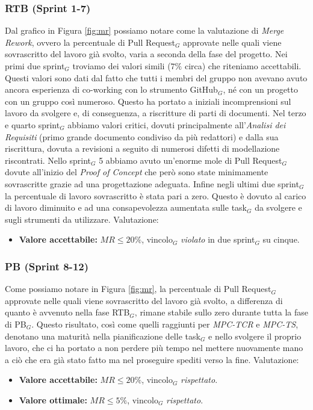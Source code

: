 \documentclass[a4paper, 10pt, colorlinks=true, linkcolor=black, urlcolor=blue, citecolor=blue, hidelinks]{article}
\begin{document}
\subsubsection{RTB (Sprint 1-7)}
Dal grafico in Figura \ref{fig:mr} possiamo notare come la valutazione di \textit{Merge Rework}, ovvero la percentuale di Pull Request$_G$ approvate nelle quali viene sovrascritto del lavoro già svolto, varia a seconda della fase del progetto. Nei primi due sprint$_G$ troviamo dei valori simili ($7\%$ circa) che riteniamo accettabili. Questi valori sono dati dal fatto che tutti i membri del gruppo non avevano avuto ancora esperienza di co-working con lo strumento GitHub$_G$, né con un progetto con un gruppo così numeroso. Questo ha portato a iniziali incomprensioni sul lavoro da svolgere e, di conseguenza, a riscritture di parti di documenti. Nel terzo e quarto sprint$_G$ abbiamo valori critici, dovuti principalmente all'\textit{Analisi dei Requisiti} (primo grande documento condiviso da più redattori) e dalla sua riscrittura, dovuta a revisioni a seguito di numerosi difetti di modellazione riscontrati.
Nello sprint$_G$ 5 abbiamo avuto un'enorme mole di Pull Request$_G$ dovute all'inizio del \textit{Proof of Concept} che però sono state minimamente sovrascritte grazie ad una progettazione adeguata. Infine negli ultimi due sprint$_G$ la percentuale di lavoro sovrascritto è stata pari a zero. Questo è dovuto al carico di lavoro diminuito e ad una consapevolezza aumentata sulle task$_G$ da svolgere e sugli strumenti da utilizzare. Valutazione:
\begin{itemize}
    \item \textbf{Valore accettabile:} $MR \leq 20\%$, vincolo$_G$ \textit{violato} in due sprint$_G$ su cinque.
\end{itemize}

\subsubsection{PB (Sprint 8-12)}
Come possiamo notare in Figura \ref{fig:mr}, la percentuale di Pull Request$_G$ approvate nelle quali viene sovrascritto del lavoro già svolto, a differenza di quanto è avvenuto nella fase RTB$_G$, rimane stabile sullo zero durante tutta la fase di PB$_G$. Questo risultato, così come quelli raggiunti per \textit{MPC-TCR} e \textit{MPC-TS}, denotano una maturità nella pianificazione delle task$_G$ e nello svolgere il proprio lavoro, che ci ha portato a non perdere più tempo nel mettere nuovamente mano a ciò che era già stato fatto ma nel proseguire spediti verso la fine.
Valutazione:
\begin{itemize}
    \item \textbf{Valore accettabile:} $MR \leq 20\%$, vincolo$_G$ \textit{rispettato}.
    \item \textbf{Valore ottimale:} $MR \leq 5\%$, vincolo$_G$ \textit{rispettato}.
\end{itemize}
\end{document}
